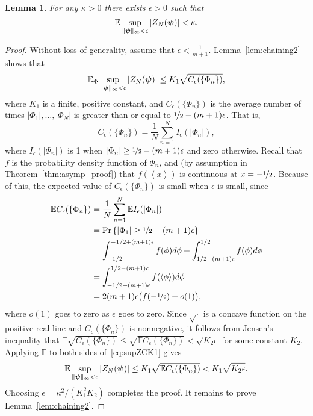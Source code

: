 \documentclass[aap,preprint]{imsart}
\newcommand{\prob}{\operatorname{Pr}}
\newcommand{\expect}{{\mathbb E}}
\newcommand{\fracpart}[1]{\left\langle #1 \right\rangle}
\newcommand{\abs}[1]{\left\vert #1 \right\vert}
\newtheorem{lemma}{Lemma}
\newcommand{\cubr}[1]{{\left\{ #1 \right\}}}
\begin{document}
\begin{lemma} \label{lem:chaining}
For any $\kappa > 0$ there exists $\epsilon > 0$ such that
\[
\expect \sup_{\|\psibf\|_{\infty} < \epsilon} \abs{ Z_N(\psibf) } < \kappa.
\]
\end{lemma}
\begin{proof}
Without loss of generality, assume that $\epsilon < \frac{1}{m+1}$.  Lemma~\ref{lem:chaining2} shows that
\begin{equation}\label{eq:supZCK1} 
\expect_\Phi \sup_{\|\psibf\|_{\infty} < \epsilon} \abs{ Z_N(\psibf) } \leq K_1 \sqrt{C_\epsilon(\{\Phi_n\})},
\end{equation}
where $K_1$ is a finite, positive constant, and $C_\epsilon(\{\Phi_n\})$ is the average number of times $\abs{\Phi_1}, \dots, \abs{\Phi_N}$ is greater than or equal to $\nicefrac{1}{2} - (m+1)\epsilon$.  That is,
\begin{equation}\label{eq:Cedefn}
C_\epsilon(\{\Phi_n\}) = \frac{1}{N} \sum_{n=1}^{N} I_\epsilon(\abs{\Phi_n}),
\end{equation}
where $I_\epsilon(\abs{\Phi_n})$ is 1 when $\abs{\Phi_n} \geq \nicefrac{1}{2} - (m+1)\epsilon$ and zero otherwise.  Recall that $f$ is the probability density function of $\Phi_n$, and (by assumption in Theorem~\ref{thm:asymp_proof}) that $f(\fracpart{x})$ is continuous at $x = -\nicefrac{1}{2}$.  Because of this, the expected value of $C_\epsilon(\{\Phi_n\})$ is small when $\epsilon$ is small, since
\begin{align*}
\expect C_\epsilon(\{\Phi_n\}) &= \frac{1}{N} \sum_{n=1}^{N} \expect I_\epsilon(\abs{\Phi_n}) \\
&= \prob\cubr{\abs{\Phi_1} \geq \nicefrac{1}{2} - (m+1)\epsilon} \\
&= \int_{-1/2}^{-1/2 + (m+1)\epsilon} f(\phi) d\phi + \int_{1/2 - (m+1)\epsilon}^{1/2} f(\phi) d\phi \\
&= \int_{-1/2 + (m+1)\epsilon}^{1/2 - (m+1)\epsilon} f(\fracpart{\phi}) d\phi \\
&= 2(m+1)\epsilon \big(f(-\nicefrac{1}{2}) + o(1)\big),
\end{align*}
where $o(1)$ goes to zero as $\epsilon$ goes to zero.  Since $\sqrt{\cdot}$ is a concave function on the positive real line and $C_{\epsilon}(\{\Phi_n\})$ is nonnegative, it follows from Jensen's inequality that $\expect \sqrt{C_\epsilon(\{\Phi_n\})} \leq  \sqrt{\expect  C_\epsilon(\{\Phi_n\} )} < \sqrt{K_2 \epsilon }$ for some constant $K_2$.  Applying $\expect$ to both sides of~\eqref{eq:supZCK1} gives
\[
\expect \sup_{\|\psibf\|_{\infty} < \epsilon} \abs{ Z_N(\psibf) } \leq K_1 \sqrt{\expect C_\epsilon(\{\Phi_n\})} < K_1 \sqrt{K_2 \epsilon}.
\]
Choosing $\epsilon = \kappa^2/(K_1^2 K_2)$ completes the proof.  It remains to prove Lemma~\ref{lem:chaining2}.
\end{proof}
\end{document}

